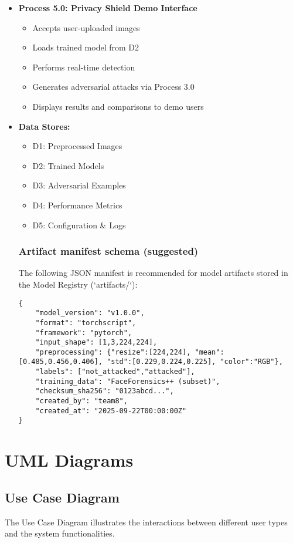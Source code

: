 \documentclass[a4paper,12pt]{article}
\begin{document}
\begin{itemize}
    \item \textbf{Process 5.0: Privacy Shield Demo Interface}
    \begin{itemize}
        \item Accepts user-uploaded images
        \item Loads trained model from D2
        \item Performs real-time detection
        \item Generates adversarial attacks via Process 3.0
        \item Displays results and comparisons to demo users
    \end{itemize}
    
    \item \textbf{Data Stores:}
    \begin{itemize}
        \item D1: Preprocessed Images
        \item D2: Trained Models
        \item D3: Adversarial Examples
        \item D4: Performance Metrics
        \item D5: Configuration \& Logs
    \end{itemize}

\subsubsection*{Artifact manifest schema (suggested)}
The following JSON manifest is recommended for model artifacts stored in the Model Registry (`artifacts/`):
\begin{verbatim}
{
    "model_version": "v1.0.0",
    "format": "torchscript",
    "framework": "pytorch",
    "input_shape": [1,3,224,224],
    "preprocessing": {"resize":[224,224], "mean":[0.485,0.456,0.406], "std":[0.229,0.224,0.225], "color":"RGB"},
    "labels": ["not_attacked","attacked"],
    "training_data": "FaceForensics++ (subset)",
    "checksum_sha256": "0123abcd...",
    "created_by": "team8",
    "created_at": "2025-09-22T00:00:00Z"
}
\end{verbatim}
\end{itemize}

\newpage
\section{UML Diagrams}

\subsection{Use Case Diagram}
The Use Case Diagram illustrates the interactions between different user types and the system functionalities.
\end{document}
